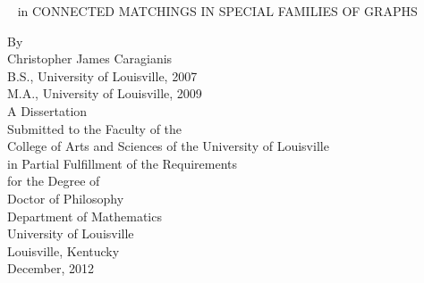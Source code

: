 \begin{titlepage}

\begin{center}\linespread{1}
 ~
 in
{\large CONNECTED MATCHINGS IN SPECIAL FAMILIES OF GRAPHS}

\vspace{1in}
By\\
\vspace{0.25 in}
Christopher James Caragianis\\
B.S., University of Louisville, 2007\\
M.A., University of Louisville, 2009\\
\vspace{0.75in}
A Dissertation\\
Submitted to the Faculty of the \\
College of Arts and Sciences of the University of Louisville\\
in Partial Fulfillment of the Requirements \\
for the Degree of\\
\vspace{0.75in}
Doctor of Philosophy\\
\vspace{0.75in}
Department of Mathematics\\
University of Louisville\\
Louisville, Kentucky\\
\vspace{0.25in}
December, 2012
\end{center}
\end{titlepage}